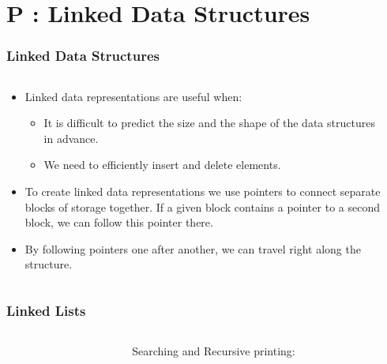 \section{P : Linked Data Structures}
\label{chap:linked}


\begin{frame}[fragile]
\frametitle{Linked Data Structures}
\begin{columns}[T]

\begin{column}{0.45\textwidth}
\begin{itemize}[<+->]
\item Linked data representations are useful when:
\begin{itemize}
\item It is difficult to predict the size and the shape of the data structures in advance.
\item We need to efficiently insert and delete elements.
\end{itemize}
\item To create linked data representations we use pointers to connect separate
blocks of storage together. If a given block contains a pointer to a second
block, we can follow this pointer there.
\item By following pointers one after another, we can travel right along
the structure.
\end{itemize}
\end{column}

\pause
\begin{column}{0.45\textwidth}

\end{column}

\end{columns}
\end{frame}



\begin{frame}[fragile]
\frametitle{Linked Lists}
\begin{columns}[T]

\begin{column}{0.45\textwidth}

\end{column}

\pause
\begin{column}{0.45\textwidth}
Searching and Recursive printing:

\end{column}

\end{columns}
\end{frame}

